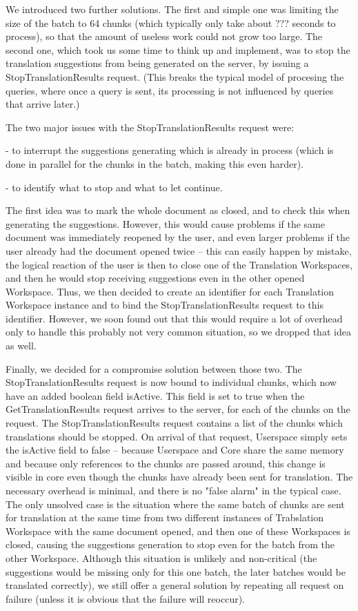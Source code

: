 We introduced two further solutions. The first and simple one was limiting the size of the batch to 64 chunks (which typically only take about ??? seconds to process), so that the amount of useless work could not grow too large. The second one, which took us some time to think up and implement, was to stop the translation suggestions from being generated on the server, by issuing a StopTranslationResults request. (This breaks the typical model of procesing the queries, where once a query is sent, its processing is not influenced by queries that arrive later.)

The two major issues with the StopTranslationResults request were:

- to interrupt the suggestions generating which is already in process (which is done in parallel for the chunks in the batch, making this even harder).

- to identify what to stop and what to let continue.

The first idea was to mark the whole document as closed, and to check this when generating the suggestions. However, this would cause problems if the same document was immediately reopened by the user, and even larger problems if the user already had the document opened twice -- this can easily happen by mistake, the logical reaction of the user is then to close one of the Translation Workspaces, and then he would stop receiving suggestions even in the other opened Workspace. Thus, we then decided to create an identifier for each Translation Workspace instance and to bind the StopTranslationResults request to this identifier. However, we soon found out that this would require a lot of overhead only to handle this probably not very common situation, so we dropped that idea as well.

Finally, we decided for a compromise solution between those two. The StopTranslationResults request is now bound to individual chunks, which now have an added boolean field isActive. This field is set to true when the GetTranslationResults request arrives to the server, for each of the chunks on the request. The StopTranslationResults request contains a list of the chunks which translations should be stopped. On arrival of that request, Userspace simply sets the isActive field to false -- because Userspace and Core share the same memory and because only references to the chunks are passed around, this change is visible in core even though the chunks have already been sent for translation. The necessary overhead is minimal, and there is no "false alarm" in the typical case. The only unsolved case is the situation where the same batch of chunks are sent for translation at the same time from two different instances of Trabslation Workspace with the same document opened, and then one of these Workspaces is closed, causing the suggestions generation to stop even for the batch from the other Workspace. Although this situation is unlikely and non-critical (the suggestions would be missing only for this one batch, the later batches would be translated correctly), we still offer a general solution by repeating all request on failure (unless it is obvious that the failure will reoccur).


